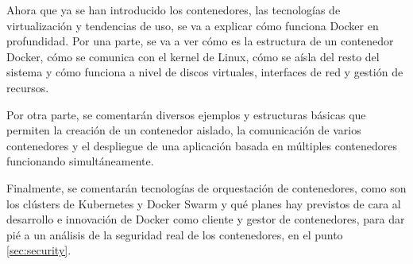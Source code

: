 Ahora que ya se han introducido los contenedores, las tecnologías de virtualización
y tendencias de uso, se va a explicar cómo funciona Docker en profundidad. Por una
parte, se va a ver cómo es la estructura de un contenedor Docker, cómo se
comunica con el kernel de Linux, cómo se aísla del resto del sistema y cómo
funciona a nivel de discos virtuales, interfaces de red y gestión de recursos.

Por otra parte, se comentarán diversos ejemplos y estructuras básicas que permiten
la creación de un contenedor aislado, la comunicación de varios contenedores y
el despliegue de una aplicación basada en múltiples contenedores funcionando
simultáneamente.

Finalmente, se comentarán tecnologías de orquestación de contenedores, como son los
clústers de Kubernetes y Docker Swarm y qué planes hay previstos de cara al desarrollo e
innovación de Docker como cliente y gestor de contenedores, para dar pié a un
análisis de la seguridad real de los contenedores, en el punto \ref{sec:security}.